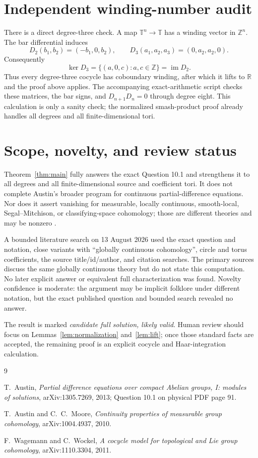 \documentclass[11pt]{article}
\newcommand{\T}{\mathbb T}
\newcommand{\R}{\mathbb R}
\newcommand{\Z}{\mathbb Z}
\begin{document}
\section{Independent winding-number audit}

There is a direct degree-three check.  A map $\T^n\to\T$ has a winding vector
in $\Z^n$.  The bar differential induces
\[
D_2(b_1,b_2)=(-b_1,0,b_2),\qquad
D_3(a_1,a_2,a_3)=(0,a_2,a_2,0).
\]
Consequently
\[
\ker D_3=\{(a,0,c):a,c\in\Z\}=\operatorname{im}D_2.
\]
Thus every degree-three cocycle has coboundary winding, after which it lifts
to $\R$ and the proof above applies.  The accompanying exact-arithmetic script
checks these matrices, the bar signs, and $D_{n+1}D_n=0$ through degree eight.
This calculation is only a sanity check; the normalized smash-product proof
already handles all degrees and all finite-dimensional tori.

\section{Scope, novelty, and review status}

Theorem~\ref{thm:main} fully answers the exact Question 10.1 and strengthens
it to all degrees and all finite-dimensional source and coefficient tori.  It
does not complete Austin's broader program for continuous partial-difference
equations.  Nor does it assert vanishing for measurable, locally continuous,
smooth-local, Segal--Mitchison, or classifying-space cohomology; those are
different theories and may be nonzero \cite{AustinMoore,WagemannWockel}.

A bounded literature search on 13 August 2026 used the exact question and
notation, close variants with ``globally continuous cohomology'', circle and
torus coefficients, the source title/id/author, and citation searches.  The
primary sources \cite{AustinMoore,WagemannWockel} discuss the same globally
continuous theory but do not state this computation.  No later explicit
answer or equivalent full characterization was found.  Novelty confidence is
moderate: the argument may be implicit folklore under different notation,
but the exact published question and bounded search revealed no answer.

The result is marked \emph{candidate full solution, likely valid}.  Human
review should focus on Lemmas~\ref{lem:normalization} and~\ref{lem:lift}; once
those standard facts are accepted, the remaining proof is an explicit
cocycle and Haar-integration calculation.

\begin{thebibliography}{9}

T.~Austin,
\emph{Partial difference equations over compact Abelian groups, I: modules of
solutions}, arXiv:1305.7269, 2013; Question 10.1 on physical PDF page 91.

T.~Austin and C.~C.~Moore,
\emph{Continuity properties of measurable group cohomology},
arXiv:1004.4937, 2010.

F.~Wagemann and C.~Wockel,
\emph{A cocycle model for topological and Lie group cohomology},
arXiv:1110.3304, 2011.

\end{thebibliography}
\end{document}
